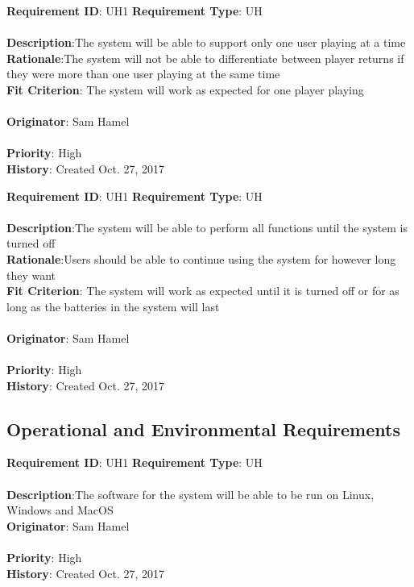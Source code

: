 \documentclass[11pt]{article}
\begin{document}
\begin{framed}
	\noindent\textbf{Requirement ID}: UH1 \hfill \textbf{Requirement Type}: UH \hfill\\\\
	\noindent\textbf{Description}:The system will be able to support only one user playing at a time \\
	\textbf{Rationale}:The system will not be able to differentiate between player returns if they were more than one user playing at the same time \\
	\textbf{Fit Criterion}: The system will work as expected for one player playing \\\\
	\textbf{Originator}: Sam Hamel \\\\
	\textbf{Priority}: High \hfill \\
	\noindent\textbf{History}: Created Oct. 27, 2017
\end{framed}

\begin{framed}
	\noindent\textbf{Requirement ID}: UH1 \hfill \textbf{Requirement Type}: UH \hfill\\\\
	\noindent\textbf{Description}:The system will be able to perform all functions until the system is turned off\\
	\textbf{Rationale}:Users should be able to continue using the system for however long they want\\
	\textbf{Fit Criterion}: The system will work as expected until it is turned off or for as long as the batteries in the system will last \\\\
	\textbf{Originator}: Sam Hamel \\\\
	\textbf{Priority}: High \hfill \\
	\noindent\textbf{History}: Created Oct. 27, 2017
\end{framed}


\subsection{Operational and Environmental Requirements}
\begin{framed}
	\noindent\textbf{Requirement ID}: UH1 \hfill \textbf{Requirement Type}: UH \hfill\\\\
	\noindent\textbf{Description}:The software for the system will be able to be run on Linux, Windows and MacOS\\
	\textbf{Originator}: Sam Hamel \\\\
	\textbf{Priority}: High \hfill \\
	\noindent\textbf{History}: Created Oct. 27, 2017
\end{framed}
\end{document}
